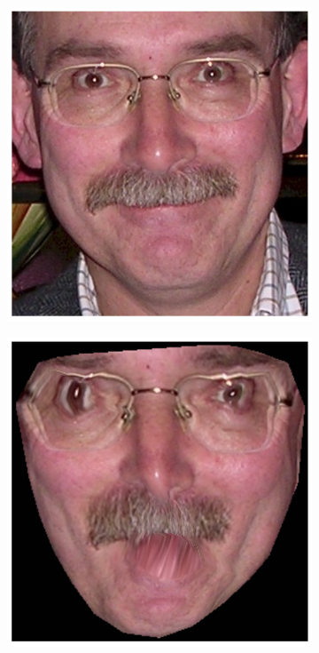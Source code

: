 \begin{figure}[h!]
\begin{subfigure}[b]{0.1\textwidth}
    \end{subfigure}
    \hfill
    \begin{subfigure}[b]{0.12\textwidth}
            \includegraphics[width=\textwidth]{resources/Fig_Draw/test_02_base}
    \end{subfigure}
   	\hfill
    \begin{subfigure}[b]{0.1\textwidth}
            \includegraphics[width=\textwidth]{resources/Fig_Draw/test_02_aam}

\end{subfigure}
\end{figure}

